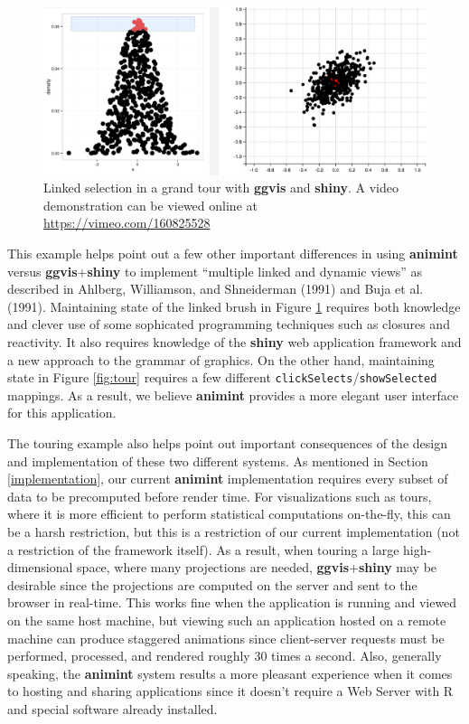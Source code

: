 \documentclass[12pt,]{article}
\theoremstyle{definition}
\theoremstyle{definition}
\theoremstyle{definition}
\theoremstyle{remark}
\begin{document}
\begin{figure}
\centering
\includegraphics{images/tourbrush}
\caption{\label{fig:tourbrush}Linked selection in a grand tour with
\textbf{ggvis} and \textbf{shiny}. A video demonstration can be viewed
online at \url{https://vimeo.com/160825528}}
\end{figure}

This example helps point out a few other important differences in using
\textbf{animint} versus \textbf{ggvis}+\textbf{shiny} to implement
``multiple linked and dynamic views'' as described in Ahlberg,
Williamson, and Shneiderman (1991) and Buja et al. (1991). Maintaining
state of the linked brush in Figure \ref{fig:tourbrush} requires both
knowledge and clever use of some sophicated programming techniques such
as closures and reactivity. It also requires knowledge of the
\textbf{shiny} web application framework and a new approach to the
grammar of graphics. On the other hand, maintaining state in Figure
\ref{fig:tour} requires a few different
\texttt{clickSelects}/\texttt{showSelected} mappings. As a result, we
believe \textbf{animint} provides a more elegant user interface for this
application.

The touring example also helps point out important consequences of the
design and implementation of these two different systems. As mentioned
in Section \ref{implementation}, our current \textbf{animint}
implementation requires every subset of data to be precomputed before
render time. For visualizations such as tours, where it is more
efficient to perform statistical computations on-the-fly, this can be a
harsh restriction, but this is a restriction of our current
implementation (not a restriction of the framework itself). As a result,
when touring a large high-dimensional space, where many projections are
needed, \textbf{ggvis}+\textbf{shiny} may be desirable since the
projections are computed on the server and sent to the browser in
real-time. This works fine when the application is running and viewed on
the same host machine, but viewing such an application hosted on a
remote machine can produce staggered animations since client-server
requests must be performed, processed, and rendered roughly 30 times a
second. Also, generally speaking, the \textbf{animint} system results a
more pleasant experience when it comes to hosting and sharing
applications since it doesn't require a Web Server with R and special
software already installed.
\end{document}
